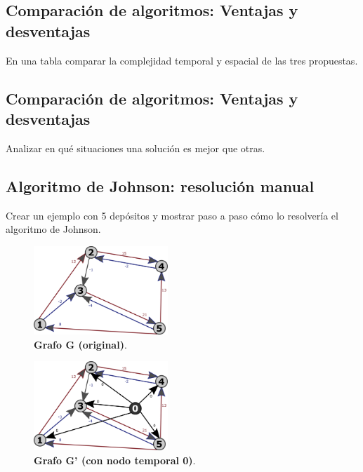 \documentclass[titlepage,a4paper]{article}
\begin{document}
\newpage\subsection{Comparación de algoritmos: Ventajas y desventajas}\label{sec:parte1_2}
\begin{tcolorbox}[colback=blue!5!white,colframe=blue!75!black,title=Enunciado 1.2]
    En una tabla comparar la complejidad temporal y espacial de las tres propuestas.
\end{tcolorbox}

\newpage\subsection{Comparación de algoritmos: Ventajas y desventajas}\label{sec:parte1_3}
\begin{tcolorbox}[colback=blue!5!white,colframe=blue!75!black,title=Enunciado 1.3]
    Analizar en qué situaciones una solución es mejor que otras.
\end{tcolorbox}

\newpage\subsection{Algoritmo de Johnson: resolución manual}\label{sec:parte1_4}
\begin{tcolorbox}[colback=blue!5!white,colframe=blue!75!black,title=Enunciado 1.4]
    Crear un ejemplo con 5 depósitos y mostrar paso a paso cómo lo resolvería el algoritmo de Johnson.
\end{tcolorbox}

\begin{figure}[H]
    \centering
    \includegraphics[width=0.45\textwidth,angle=0,origin=c]{out/ford/ford1A.png}
    \caption{\label{fig:grafoG}\textbf{Grafo G (original)}.}
\end{figure}

\begin{figure}[H]
    \centering
    \includegraphics[width=0.45\textwidth,angle=0,origin=c]{out/ford/ford1B.png}
    \caption{\label{fig:grafoG_prima}\textbf{Grafo G' (con nodo temporal 0)}.}
\end{figure}
\end{document}
